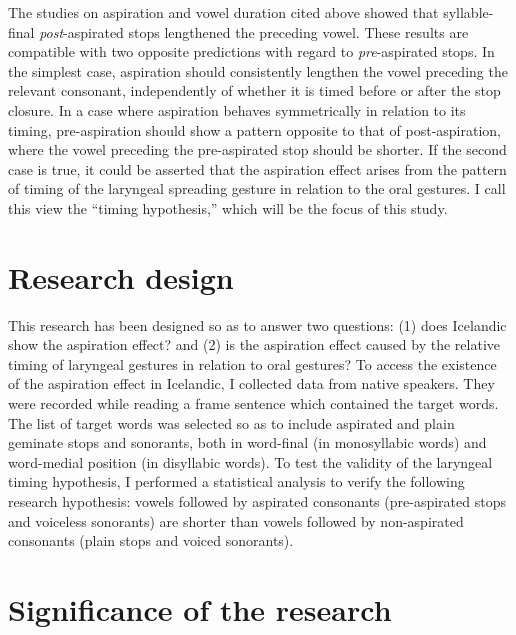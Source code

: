 \documentclass[11pt,a4paper,openany]{memoir}\usepackage[]{graphicx}\usepackage[]{color}
\begin{document}
The studies on aspiration and vowel duration cited above showed that syllable-final \textit{post}-aspirated stops lengthened the preceding vowel.
These results are compatible with two opposite predictions with regard to \textit{pre}-aspirated stops.
In the simplest case, aspiration should consistently lengthen the vowel preceding the relevant consonant, independently of whether it is timed before or after the stop closure.
In a case where aspiration behaves symmetrically in relation to its timing, pre-aspiration should show a pattern opposite to that of post-aspiration, where the vowel preceding the pre-aspirated stop should be shorter.
If the second case is true, it could be asserted that the aspiration effect arises from the pattern of timing of the laryngeal spreading gesture in relation to the oral gestures.
I call this view the ``timing hypothesis,'' which will be the focus of this study.

\section{Research design}

This research has been designed so as to answer two questions: (1) does Icelandic show the aspiration effect? and (2) is the aspiration effect caused by the relative timing of laryngeal gestures in relation to oral gestures?
To access the existence of the aspiration effect in Icelandic, I collected data from native speakers.
They were recorded while reading a frame sentence which contained the target words.
The list of target words was selected so as to include aspirated and plain geminate stops and sonorants, both in word-final (in monosyllabic words) and word-medial position (in disyllabic words).
To test the validity of the laryngeal timing hypothesis, I performed a statistical analysis to verify the following research hypothesis: vowels followed by aspirated consonants (pre-aspirated stops and voiceless sonorants) are shorter than vowels followed by non-aspirated consonants (plain stops and voiced sonorants).


\section{Significance of the research}
\end{document}

